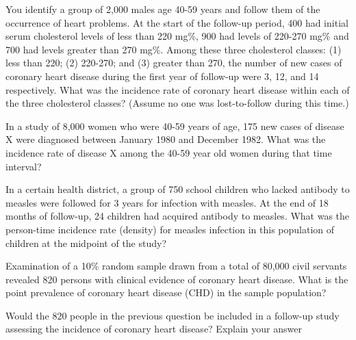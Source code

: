 \documentclass[a4paper]{exam}
\begin{document}
\begin{questions}
    \question[10]
    You identify a group of 2,000 males age 40-59 years and follow them of the occurrence of heart problems. At the start of the follow-up period, 400 had initial serum cholesterol levels of less than 220 mg\%, 900 had levels of 220-270 mg\% and 700 had levels greater than 270 mg\%. Among these three cholesterol classes: (1) less than 220; (2) 220-270; and (3) greater than 270, the number of new cases of coronary heart disease during the first year of follow-up were 3, 12, and 14 respectively. What was the incidence rate of coronary heart disease within each of the three cholesterol classes? (Assume no one was lost-to-follow during this time.)

    \begin{solution}
        
    \end{solution}

    \question[10]
    In a study of 8,000 women who were 40-59 years of age, 175 new cases of disease X were diagnosed between January 1980 and December 1982. What was the incidence rate of disease X among the 40-59 year old women during that time interval?

    \begin{solution}
        
    \end{solution}

    \question[10]
    In a certain health district, a group of 750 school children who lacked antibody to measles were followed for 3 years for infection with measles. At the end of 18 months of follow-up, 24 children had acquired antibody to measles. What was the person-time incidence rate (density) for measles infection in this population of children at the midpoint of the study?

    \begin{solution}
        
    \end{solution}

    \question[10]
    Examination of a 10\% random sample drawn from a total of 80,000 civil servants revealed 820 persons with clinical evidence of coronary heart disease. What is the point prevalence of coronary heart disease (CHD) in the sample population?

    \begin{solution}
        
    \end{solution}

    \question[10]
    Would the 820 people in the previous question be included in a follow-up study assessing the incidence of coronary heart disease? Explain your answer


\end{questions}
\end{document}
